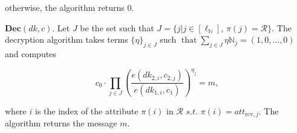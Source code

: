 \documentclass[runningheads]{llncs}
\begin{document}
otherwise, the algorithm returns 0.

$\mathbf{Dec}(dk,c).$ Let $J$ be the set such that $J=\{j|j\in[\ell_{\mathbb{N}}]$, $\pi(j)=\mathcal{R}\}.$ The decryption algorithm takes terms $\{\eta\}_{j\in J}$ such $\mathop{\mathrm{that}}\sum_{j\in J}\eta\mathbb{N}_{j}=(1,0,\ldots,0)$ and computes

$$c_0\cdot\prod_{j\in J}\left(\frac{e(dk_{2,i},c_{2,j})}{e(dk_{1,i},c_1)}\right)^{\eta_j}=m,$$

where $i$ is the index of the attribute $\pi(i)$ in $\mathcal{R}$ $s.t.$
$\pi(i)=att_{\mathrm{rcv},j}.$ The algorithm returns the message $m.$
\end{document}
